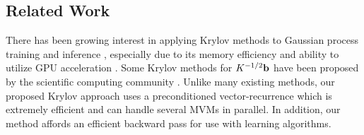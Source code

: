 \subsection{Related Work}
There has been growing interest in applying Krylov methods to Gaussian process training and inference , especially due to its memory efficiency and ability to utilize GPU acceleration \cite{gardner2018gpytorch,wang2019exact}.
Some Krylov methods for $K^{-1/2} \mathbf{b}$ have been proposed by the scientific computing community \cite{aune2013iterative,aune2014parameter,chow2014preconditioned,saibaba2013flexible}.
Unlike many existing methods, our proposed Krylov approach uses a preconditioned vector-recurrence which is extremely efficient and can handle several MVMs in parallel.
In addition, our method affords an efficient backward pass for use with learning algorithms.
